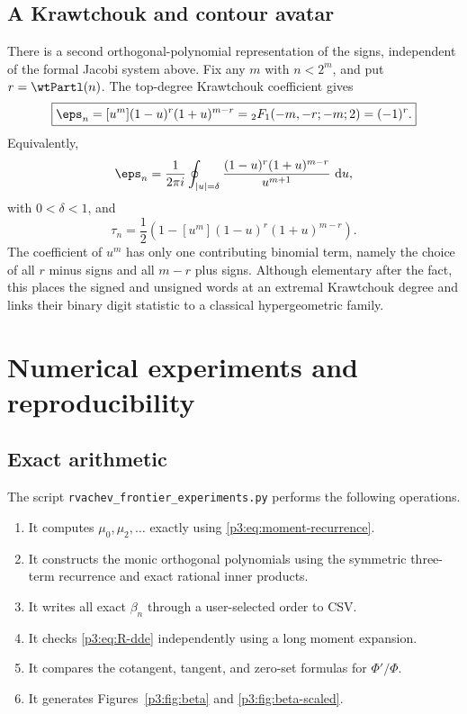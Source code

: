 \documentclass[11pt,oneside]{article}
\theoremstyle{definition}
\newcommand{\dd}{\,\mathrm d}
\begin{document}
\subsection{A Krawtchouk and contour avatar}

There is a second orthogonal-polynomial representation of the signs, independent of the
formal Jacobi system above.  Fix any \(m\) with \(n<2^m\), and put
\(r=\wtPartl(n)\).  The top-degree Krawtchouk coefficient \cite{p3:Koekoek} gives
\begin{equation}
\boxed{
 \eps_n=[u^m](1-u)^r(1+u)^{m-r}
 ={}_2F_1(-m,-r;-m;2)=(-1)^r.}                             \label{p3:eq:tm-krawtchouk}
\end{equation}
Equivalently,
\begin{equation}
 \eps_n=\frac1{2\pi i}\oint_{|u|=\delta}
 \frac{(1-u)^r(1+u)^{m-r}}{u^{m+1}}\,\dd u,               \label{p3:eq:tm-krawtchouk-contour}
\end{equation}
with \(0<\delta<1\), and
\begin{equation}
 \tau_n=\frac12\left(1-[u^m](1-u)^r(1+u)^{m-r}\right).    \label{p3:eq:tau-krawtchouk}
\end{equation}
The coefficient of \(u^m\) has only one contributing binomial term, namely the choice of
all \(r\) minus signs and all \(m-r\) plus signs.  Although elementary after the fact,
this places the signed and unsigned words at an extremal Krawtchouk degree and links their
binary digit statistic to a classical hypergeometric family.



\section{Numerical experiments and reproducibility}

\subsection{Exact arithmetic}

The script \texttt{rvachev\_frontier\_experiments.py} performs the following operations.

\begin{enumerate}
\item It computes \(\mu_0,\mu_2,\dots\) exactly using \eqref{p3:eq:moment-recurrence}.
\item It constructs the monic orthogonal polynomials using the symmetric three-term
      recurrence and exact rational inner products.
\item It writes all exact \(\beta_n\) through a user-selected order to CSV.
\item It checks \eqref{p3:eq:R-dde} independently using a long moment expansion.
\item It compares the cotangent, tangent, and zero-set formulas for \(\Phi'/\Phi\).
\item It generates Figures~\ref{p3:fig:beta} and \ref{p3:fig:beta-scaled}.
\end{enumerate}
\end{document}
